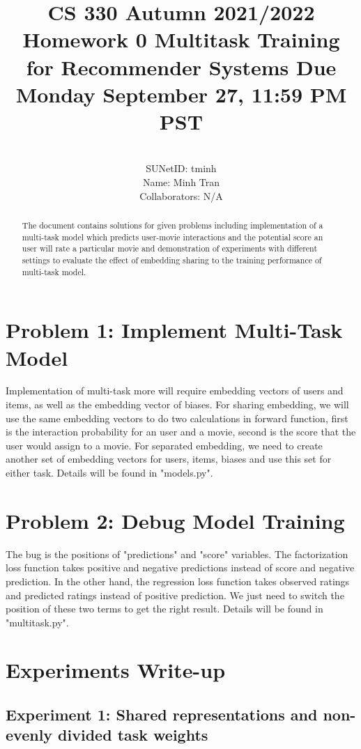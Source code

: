 \documentclass[]{article}
\title{\textbf{CS 330 Autumn 2021/2022 Homework 0}
	{Multitask Training for Recommender Systems
		Due Monday September 27, 11:59 PM PST}}
\author{
			\\SUNetID: tminh 
			\\Name: Minh Tran 
			\\Collaborators: N/A 
		}
\begin{document}
	
	\maketitle
	
	\begin{abstract}
		
		The document contains solutions for given problems including implementation of a multi-task model which predicts user-movie interactions and the potential score an user will rate a particular movie and demonstration of experiments with different settings to evaluate the effect of embedding sharing to the training performance of multi-task model.
		
	\end{abstract}
	
	\section{Problem 1: Implement Multi-Task Model}
	Implementation of multi-task more will require embedding vectors of users and items, as well as the embedding vector of biases. For sharing embedding, we will use the same embedding vectors to do two calculations in forward function, first is the interaction probability for an user and a movie, second is the score that the user would assign to a movie. For separated embedding, we need to create another set of embedding vectors for users, items, biases and use this set for either task.
	Details will be found in "models.py".	
	
	\section{Problem 2: Debug Model Training}
	The bug is the positions of "predictions" and "score" variables. The factorization loss function takes positive and negative predictions instead of score and negative prediction. In the other hand, the regression loss function takes observed ratings and predicted ratings instead of positive prediction. We just need to switch the position of these two terms to get the right result.
	Details will be found in "multitask.py".
	
	\section{Experiments Write-up}
	\subsection{Experiment 1: Shared representations and non-evenly divided task weights}
	
\end{document}
